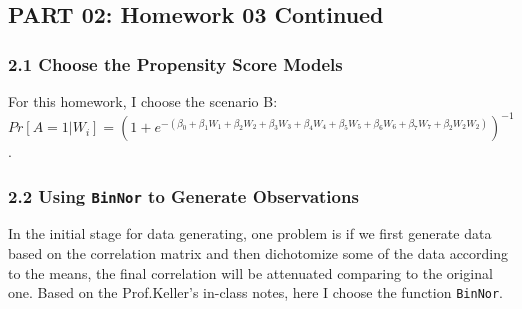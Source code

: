 \documentclass[
]{article}
\begin{document}
\hypertarget{part-02-homework-03-continued}{%
\subsection{PART 02: Homework 03
Continued}\label{part-02-homework-03-continued}}

\hypertarget{choose-the-propensity-score-models}{%
\subsubsection{2.1 Choose the Propensity Score
Models}\label{choose-the-propensity-score-models}}

For this homework, I choose the scenario B:
\[Pr[A=1|W_i]=(1+e^{-(\beta_0+\beta_1W_1+\beta_2W_2+\beta_3W_3+\beta_4W_4+\beta_5W_5 +\beta_6W_6+\beta_7W_7+\beta_2W_2W_2)})^{-1}\].

\hypertarget{using-binnor-to-generate-observations}{%
\subsubsection{\texorpdfstring{2.2 Using \texttt{BinNor} to Generate
Observations}{2.2 Using BinNor to Generate Observations}}\label{using-binnor-to-generate-observations}}

In the initial stage for data generating, one problem is if we first
generate data based on the correlation matrix and then dichotomize some
of the data according to the means, the final correlation will be
attenuated comparing to the original one. Based on the Prof.Keller's
in-class notes, here I choose the function \texttt{BinNor}.
\end{document}
